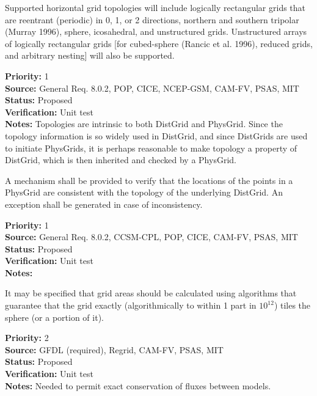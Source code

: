  Supported horizontal grid topologies will include
logically rectangular grids that are reentrant (periodic) in 0, 1, or 2 directions,
northern and southern tripolar (Murray 1996), sphere, icosahedral, and unstructured
grids.  Unstructured arrays of logically rectangular grids [for cubed-sphere (Rancic
et al. 1996), reduced grids, and arbitrary nesting] will also be supported.
\begin{reqlist}
{\bf Priority:} 1 \\
{\bf Source:} General Req. 8.0.2, POP, CICE, NCEP-GSM,
CAM-FV, PSAS, MIT  \\
{\bf Status:} Proposed \\
{\bf Verification:} Unit test\\
{\bf Notes:}  Topologies are intrinsic to both DistGrid and PhysGrid.  Since
the topology information is so widely used in DistGrid, and since DistGrids
are used to initiate PhysGrids, it is perhaps reasonable to make topology a
property of DistGrid, which is then inherited and checked by a PhysGrid.
\end{reqlist}

A mechanism shall be provided to verify that the locations of the points in
a PhysGrid are consistent with the topology of the underlying DistGrid.  An
exception shall be generated in case of inconsistency.
\begin{reqlist}
{\bf Priority:} 1 \\
{\bf Source:} General Req. 8.0.2, CCSM-CPL, POP, CICE, 
CAM-FV, PSAS, MIT  \\
{\bf Status:} Proposed \\
{\bf Verification:} Unit test\\
{\bf Notes:}
\end{reqlist}

It may be specified that grid areas should be calculated using algorithms that
guarantee that the grid exactly (algorithmically to within 1 part in $10^{12}$) tiles
the sphere (or a portion of it). 
\begin{reqlist}
{\bf Priority:} 2 \\
{\bf Source:} GFDL (required), Regrid, 
CAM-FV, PSAS, MIT  \\
{\bf Status:} Proposed \\
{\bf Verification:} Unit test\\
{\bf Notes:} Needed to permit exact conservation of fluxes between models.
\end{reqlist}

